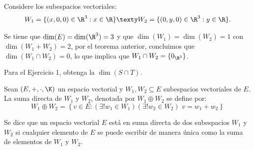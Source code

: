 \documentclass[compacto,10pt]{pubciencias-notas}
\begin{document}
\begin{ejem}\hspace{0pt} Considere los subespacios vectoriales:
\[
    W_{1} = \{(x,0,0)\in \R^3: x \in \R \} 
    \texty
    W_{2} = \{(0,y,0)\in \R^3: y \in \R\}.
\]

Se tiene que $\dim(E) = \dim(\R^{3}) = 3$ y que $\dim(W_{1}) = \dim(W_{2}) = 1$ con $\dim(W_{1} + W_{2}) = 2$, por el teorema anterior, concluimos que $\dim(W_{1} \cap W_{2}) = 0$, lo que implica que $W_{1} \cap W_{2} = \{0_{\R^{3}}\}$.
\end{ejem}

\begin{ejer}\hspace{0pt} Para el Ejercicio 1, obtenga la $\dim(S\cap T)$.
\end{ejer}

\begin{defi}
    Sean $(E,+,\cdot,\K)$ un espacio vectorial y $W_1, W_2\subseteq E$ subespacios vectoriales de $E$. La suma directa de $W_1$ y $W_2$, denotada por $W_1\oplus W_2$ se define por:
    \[
        W_1 \oplus W_2 =\left\{v\in E : (\exists !w_1\in W_1)(\exists !w_2\in W_2)\, \, v=w_1+w_2 \right\} 
    \]
\end{defi}

\begin{advertencia}
Se dice que un espacio vectorial $E$ está en suma directa de dos subespacios $W_1$ y $W_2$ si cualquier elemento de $E$ se puede escribir de manera única como la suma de elementos de $W_1$ y $W_2$.
\end{advertencia}
\end{document}
